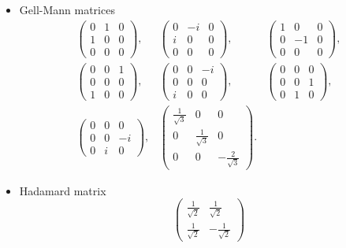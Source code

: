 \documentclass[final,5p,times]{elsarticle}
\newcommand{\1}{{\rm 1\hspace{-0.9mm}l}}
\begin{document}
\begin{itemize}
\item Gell-Mann matrices
\begin{eqnarray}\nonumber
\left(
\begin{array}{ccc}
 0 & 1 & 0 \\
 1 & 0 & 0 \\
 0 & 0 & 0
\end{array}
\right),&\left(
\begin{array}{ccc}
 0 & -i & 0 \\
 i & 0 & 0 \\
 0 & 0 & 0
\end{array}
\right),&\left(
\begin{array}{ccc}
 1 & 0 & 0 \\
 0 & -1 & 0 \\
 0 & 0 & 0
\end{array}
\right),
\\\nonumber
\left(
\begin{array}{ccc}
 0 & 0 & 1 \\
 0 & 0 & 0 \\
 1 & 0 & 0
\end{array}
\right),&\left(
\begin{array}{ccc}
 0 & 0 & -i \\
 0 & 0 & 0 \\
 i & 0 & 0
\end{array}
\right),&\left(
\begin{array}{ccc}
 0 & 0 & 0 \\
 0 & 0 & 1 \\
 0 & 1 & 0
\end{array}
\right),
\\
\left(
\begin{array}{ccc}
 0 & 0 & 0 \\
 0 & 0 & -i \\
 0 & i & 0
\end{array}
\right),&\left(
\begin{array}{ccc}
 \frac{1}{\sqrt{3}} & 0 & 0 \\
 0 & \frac{1}{\sqrt{3}} & 0 \\
 0 & 0 & -\frac{2}{\sqrt{3}}
\end{array}
\right).
\end{eqnarray}
\item Hadamard matrix 
\begin{equation}
\left(
\begin{array}{cc}
 \frac{1}{\sqrt{2}} & \frac{1}{\sqrt{2}} \\
 \frac{1}{\sqrt{2}} & -\frac{1}{\sqrt{2}}
\end{array}
\right)
\end{equation}
\end{itemize}
\end{document}
